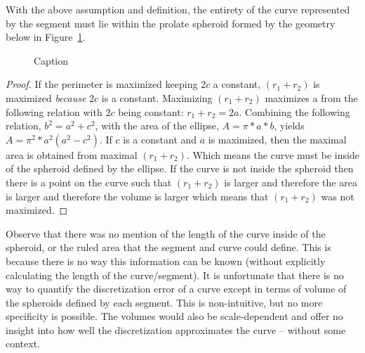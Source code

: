 \begin{theorem}
With the above assumption and definition, the entirety of the curve 
represented by the segment must lie within the prolate spheroid  formed by the geometry below in Figure~\ref{EllipseGeometry}.
\end{theorem}

\begin{figure}[h!]
  \caption{\label{EllipseGeometry} Caption}
\end{figure}

\begin{proof}
If the perimeter is maximized keeping $2c$ a constant, $(r_1 + r_2)$ is 
maximized \textit{because} $2c$ is a constant.  Maximizing $(r_1+r_2)$ 
maximizes a from the following relation with $2c$ being constant: $r_1 + 
r_2 = 2a$.  Combining the following relation, $b^2 = a^2 + c^2$, with the 
area of the ellipse, $A = \pi * a * b$, yields $A=\pi^{2}*a^{2}(a^{2} - 
c^2)$.  If $c$ is a constant and $a$ is maximized, then the maximal area 
is obtained from maximal $(r_1+r_2)$.  Which means the curve must be 
inside of the spheroid defined by the ellipse.  If the curve is not inside 
the spheroid then there is a point on the curve such that $(r_1+r_2)$ is 
larger and therefore the area is larger and therefore the volume is larger 
which means that $(r_1+r_2)$ was not maximized.
\end{proof}

Observe that there was no mention of the length of the curve inside of the 
spheroid, or the ruled area that the segment and curve could define.  
This is because there is no way this information can be known (without 
explicitly calculating the length of the curve/segment).  It is 
unfortunate that there is no way to quantify the discretization error of a 
curve except in terms of volume of the spheroids defined by each segment.  
This is non-intuitive, but no more specificity is possible.  The volumes 
would also be scale-dependent and offer no insight into how well the 
discretization approximates the curve -- without some context.
